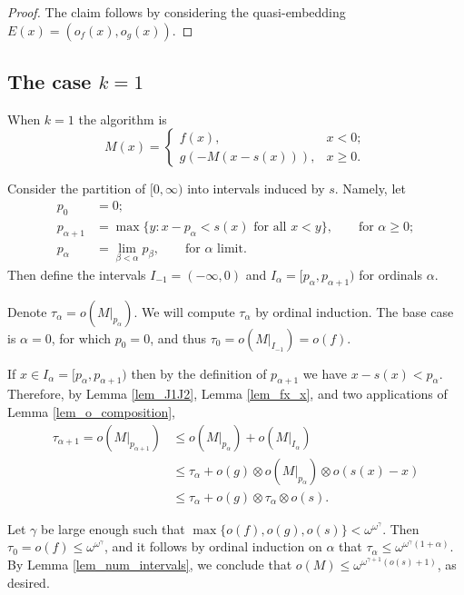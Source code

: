 \documentclass{article}
\theoremstyle{definition}
\begin{document}
\begin{proof}
    The claim follows by considering the quasi-embedding $E(x) = (o_f(x), o_g(x))$.
\end{proof}

\subsection{The case $k=1$}

When $k=1$ the algorithm is
\begin{equation*}
    M(x) = \begin{cases}f(x),& x<0;\\g(-M(x-s(x))),& x\ge 0.\end{cases}
\end{equation*}

Consider the partition of $[0,\infty)$ into intervals induced by $s$. Namely, let
\begin{align*}
    p_0 &= 0;\\
    p_{\alpha+1} &= \max{\{ y : x- p_\alpha < s(x) \text{ for all $x<y$}\}}, \qquad \text{for $\alpha\ge 0$};\\
    p_\alpha &= \lim_{\beta<\alpha} p_\beta, \qquad \text{for $\alpha$ limit}.
\end{align*}
Then define the intervals $I_{-1} = (-\infty, 0)$ and $I_\alpha = [p_\alpha, p_{\alpha+1})$ for ordinals $\alpha$.

Denote $\tau_\alpha = o(M|_{p_\alpha})$. We will compute $\tau_\alpha$ by ordinal induction. The base case is $\alpha=0$, for which $p_0=0$, and thus $\tau_0 = o(M|_{I_{-1}}) = o(f)$.


If $x\in I_{\alpha} = [p_\alpha, p_{\alpha+1})$ then by the definition of $p_{\alpha+1}$ we have $x-s(x) < p_\alpha$. Therefore, by Lemma \ref{lem_J1J2}, Lemma \ref{lem_fx_x}, and two applications of Lemma \ref{lem_o_composition},
\begin{align*}
    \tau_{\alpha+1} = o(M|_{ p_{\alpha+1}}) &\le o(M|_{p_\alpha}) + o(M|_{I_\alpha}) \\
    &\le \tau_\alpha+o(g)\otimes o(M|_{p_\alpha})\otimes o(s(x)-x)\\
    &\le \tau_\alpha + o(g)\otimes\tau_\alpha \otimes o(s).
\end{align*}

Let $\gamma$ be large enough such that $\max{\{o(f),o(g),o(s)\}} < \omega^{\omega^\gamma}$. Then $\tau_0 = o(f)\le\omega^{\omega^\gamma}$, and it follows by ordinal induction on $\alpha$ that $\tau_\alpha\le \omega^{\omega^\gamma(1+\alpha)}$. By Lemma \ref{lem_num_intervals}, we conclude that $o(M)\le \omega^{\omega^{\gamma+1}(o(s)+1)}$, as desired.
\end{document}
